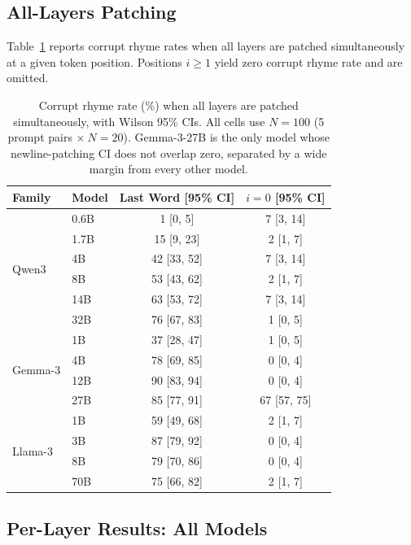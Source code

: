 \documentclass{article}
\begin{document}
\subsection*{All-Layers Patching}
\label{sec:patch-all-layers}

Table~\ref{tab:patch-all-layers} reports corrupt rhyme rates when all layers are patched simultaneously at a given token position. Positions $i \geq 1$ yield zero corrupt rhyme rate and are omitted.

\begin{table}[h]
\centering
\small
\begin{tabular}{llcc}
\toprule
Family & Model & Last Word [95\% CI] & $i=0$ [95\% CI] \\
\midrule
\multirow{6}{*}{Qwen3}
 & 0.6B  & 1 [0, 5]    & 7 [3, 14]  \\
 & 1.7B  & 15 [9, 23]  & 2 [1, 7]   \\
 & 4B    & 42 [33, 52] & 7 [3, 14]  \\
 & 8B    & 53 [43, 62] & 2 [1, 7]   \\
 & 14B   & 63 [53, 72] & 7 [3, 14]  \\
 & 32B   & 76 [67, 83] & 1 [0, 5]   \\
\midrule
\multirow{4}{*}{Gemma-3}
 & 1B    & 37 [28, 47] & 1 [0, 5]   \\
 & 4B    & 78 [69, 85] & 0 [0, 4]   \\
 & 12B   & 90 [83, 94] & 0 [0, 4]   \\
 & 27B   & 85 [77, 91] & 67 [57, 75] \\
\midrule
\multirow{4}{*}{Llama-3}
 & 1B    & 59 [49, 68] & 2 [1, 7]   \\
 & 3B    & 87 [79, 92] & 0 [0, 4]   \\
 & 8B    & 79 [70, 86] & 0 [0, 4]   \\
 & 70B   & 75 [66, 82] & 2 [1, 7]   \\
\bottomrule
\end{tabular}
\caption{Corrupt rhyme rate (\%) when all layers are patched simultaneously, with Wilson 95\% CIs. All cells use $N{=}100$ (5 prompt pairs $\times\ N{=}20$). Gemma-3-27B is the only model whose newline-patching CI does not overlap zero, separated by a wide margin from every other model.}
\label{tab:patch-all-layers}
\end{table}

\subsection*{Per-Layer Results: All Models}
\end{document}
